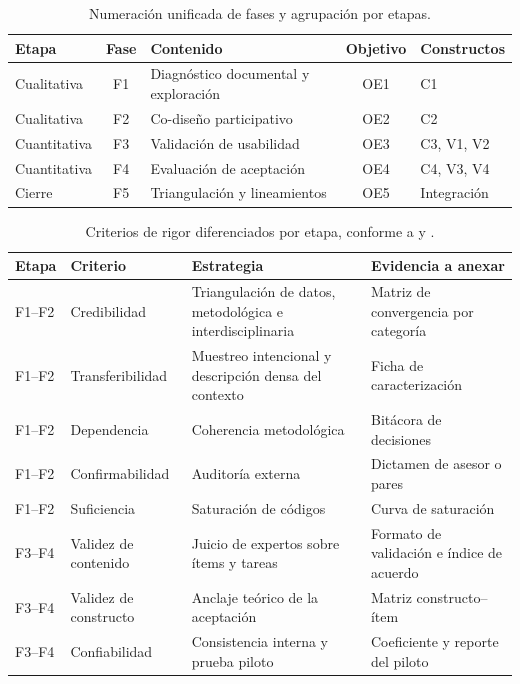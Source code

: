 \documentclass[letter,12pt]{article}
\begin{document}
\begin{table}[H]
\centering
\footnotesize
\caption{Numeración unificada de fases y agrupación por etapas.}
\label{tab:etapas}
\renewcommand{\arraystretch}{1.35}
\begin{tabular}{|p{2.4cm}|c|p{4.6cm}|c|p{2.0cm}|}
\hline
\rowcolor{bgCotejo}
\textbf{Etapa} & \textbf{Fase} & \textbf{Contenido} & \textbf{Objetivo} & \textbf{Constructos} \\
\hline
Cualitativa & F1 & Diagnóstico documental y exploración & OE1 & C1 \\
\hline
Cualitativa & F2 & Co-diseño participativo & OE2 & C2 \\
\hline
Cuantitativa & F3 & Validación de usabilidad & OE3 & C3, V1, V2 \\
\hline
Cuantitativa & F4 & Evaluación de aceptación & OE4 & C4, V3, V4 \\
\hline
Cierre & F5 & Triangulación y lineamientos & OE5 & Integración \\
\hline
\end{tabular}
\end{table}

\begin{table}[H]
\centering
\footnotesize
\caption{Criterios de rigor diferenciados por etapa, conforme a \citet{gaete} y \citet{lincolnguba1985}.}
\label{tab:rigor}
\renewcommand{\arraystretch}{1.35}
\begin{tabular}{|p{1.6cm}|p{2.7cm}|p{4.4cm}|p{3.6cm}|}
\hline
\rowcolor{bgCotejo}
\textbf{Etapa} & \textbf{Criterio} & \textbf{Estrategia} & \textbf{Evidencia a anexar} \\
\hline
F1--F2 & Credibilidad & Triangulación de datos, metodológica e interdisciplinaria & Matriz de convergencia por categoría \\
\hline
F1--F2 & Transferibilidad & Muestreo intencional y descripción densa del contexto & Ficha de caracterización \\
\hline
F1--F2 & Dependencia & Coherencia metodológica & Bitácora de decisiones \\
\hline
F1--F2 & Confirmabilidad & Auditoría externa & Dictamen de asesor o pares \\
\hline
F1--F2 & Suficiencia & Saturación de códigos & Curva de saturación \\
\hline
F3--F4 & Validez de contenido & Juicio de expertos sobre ítems y tareas & Formato de validación e índice de acuerdo \\
\hline
F3--F4 & Validez de constructo & Anclaje teórico de la aceptación & Matriz constructo--ítem \\
\hline
F3--F4 & Confiabilidad & Consistencia interna y prueba piloto & Coeficiente y reporte del piloto \\
\hline
\end{tabular}
\end{table}
\end{document}
